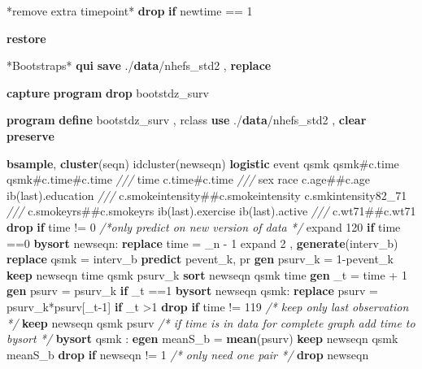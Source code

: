 \documentclass[
  10pt,
]{book}
\newenvironment{Shaded}{\begin{snugshade}}{\end{snugshade}}
\newcommand{\CommentTok}[1]{\textcolor[rgb]{0.56,0.35,0.01}{\textit{#1}}}
\newcommand{\DataTypeTok}[1]{\textcolor[rgb]{0.13,0.29,0.53}{#1}}
\newcommand{\FunctionTok}[1]{\textcolor[rgb]{0.00,0.00,0.00}{#1}}
\newcommand{\KeywordTok}[1]{\textcolor[rgb]{0.13,0.29,0.53}{\textbf{#1}}}
\newcommand{\NormalTok}[1]{#1}
\begin{document}
\begin{Shaded}
\begin{Highlighting}[]
\NormalTok{*remove extra timepoint*}
\KeywordTok{drop} \KeywordTok{if}\NormalTok{ newtime == 1}

\KeywordTok{restore}

\NormalTok{*Bootstraps*}
\KeywordTok{qui} \KeywordTok{save}\NormalTok{ ./}\KeywordTok{data}\NormalTok{/nhefs\_std2 , }\KeywordTok{replace}
 
\KeywordTok{capture} \KeywordTok{program} \KeywordTok{drop}\NormalTok{ bootstdz\_surv}

\KeywordTok{program} \KeywordTok{define}\NormalTok{ bootstdz\_surv , rclass}
\KeywordTok{use}\NormalTok{ ./}\KeywordTok{data}\NormalTok{/nhefs\_std2 , }\KeywordTok{clear}
\KeywordTok{preserve}

\KeywordTok{bsample}\NormalTok{, }\KeywordTok{cluster}\NormalTok{(seqn) idcluster(newseqn)       }
\KeywordTok{logistic}\NormalTok{ event qsmk qsmk\#c.time qsmk\#c.time\#c.time }\CommentTok{///}
\NormalTok{  time c.time\#c.time }\CommentTok{///}
\NormalTok{    sex race c.age\#\#c.age ib(}\FunctionTok{last}\NormalTok{).education }\CommentTok{///}
\NormalTok{    c.smokeintensity\#\#c.smokeintensity c.smkintensity82\_71 }\CommentTok{///}
\NormalTok{    c.smokeyrs\#\#c.smokeyrs ib(}\FunctionTok{last}\NormalTok{).exercise ib(}\FunctionTok{last}\NormalTok{).active }\CommentTok{///}
\NormalTok{    c.wt71\#\#c.wt71 }
\KeywordTok{drop} \KeywordTok{if}\NormalTok{ time != 0   }
\CommentTok{/*only predict on new version of data */}
\NormalTok{expand 120 }\KeywordTok{if}\NormalTok{ time ==0 }
\KeywordTok{bysort}\NormalTok{ newseqn: }\KeywordTok{replace}\NormalTok{ time = }\DataTypeTok{\_n}\NormalTok{ {-} 1               }
\NormalTok{expand 2 , }\KeywordTok{generate}\NormalTok{(interv\_b) }
\KeywordTok{replace}\NormalTok{ qsmk = interv\_b          }
\KeywordTok{predict}\NormalTok{ pevent\_k, pr}
\KeywordTok{gen}\NormalTok{ psurv\_k = 1{-}pevent\_k}
\KeywordTok{keep}\NormalTok{ newseqn  time qsmk psurv\_k                 }
\KeywordTok{sort}\NormalTok{ newseqn qsmk time}
\KeywordTok{gen}\NormalTok{ \_t = time + 1}
\KeywordTok{gen}\NormalTok{ psurv = psurv\_k }\KeywordTok{if}\NormalTok{ \_t ==1   }
\KeywordTok{bysort}\NormalTok{ newseqn  qsmk: }\KeywordTok{replace}\NormalTok{ psurv = psurv\_k*psurv[\_t{-}1] }\KeywordTok{if}\NormalTok{ \_t \textgreater{}1 }
\KeywordTok{drop}  \KeywordTok{if}\NormalTok{ time != 119   }\CommentTok{/* keep only last observation */}
\KeywordTok{keep}\NormalTok{ newseqn qsmk psurv    }
\CommentTok{/* if time is in data for complete graph add time to bysort */}  
\KeywordTok{bysort}\NormalTok{ qsmk  : }\KeywordTok{egen}\NormalTok{ meanS\_b = }\KeywordTok{mean}\NormalTok{(psurv)}
\KeywordTok{keep}\NormalTok{ newseqn qsmk  meanS\_b }
\KeywordTok{drop} \KeywordTok{if}\NormalTok{ newseqn != 1  }\CommentTok{/* only need one pair */}
\KeywordTok{drop}\NormalTok{ newseqn        }
    

\end{Highlighting}
\end{Shaded}
\end{document}
